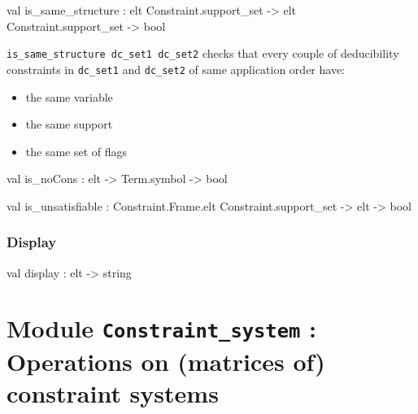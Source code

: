 \begin{ocamldocsigend}
\begin{ocamldocdescription}
\end{ocamldocdescription}


\label{val:Constraint.Deducibility.is-underscoresame-underscorestructure}\begin{ocamldoccode}
val is_same_structure :
  elt Constraint.support_set ->
  elt Constraint.support_set -> bool
\end{ocamldoccode}
\begin{ocamldocdescription}
{\tt{is\_same\_structure dc\_set1 dc\_set2}} checks that every couple of deducibility constraints in {\tt{dc\_set1}} and {\tt{dc\_set2}}
      of same application order have:
      \begin{itemize}
\item the same variable 
\item the same support 
\item the same set of flags
\end{itemize}



\end{ocamldocdescription}


\label{val:Constraint.Deducibility.is-underscorenoCons}\begin{ocamldoccode}
val is_noCons : elt -> Term.symbol -> bool
\end{ocamldoccode}


\label{val:Constraint.Deducibility.is-underscoreunsatisfiable}\begin{ocamldoccode}
val is_unsatisfiable :
  Constraint.Frame.elt Constraint.support_set ->
  elt -> bool
\end{ocamldoccode}


\subsubsection{Display}


\label{val:Constraint.Deducibility.display}\begin{ocamldoccode}
val display : elt -> string
\end{ocamldoccode}
\end{ocamldocsigend}




\section{Module {\tt{Constraint\_system}} : Operations on (matrices of) constraint systems}
\label{module:Constraint-underscoresystem}




